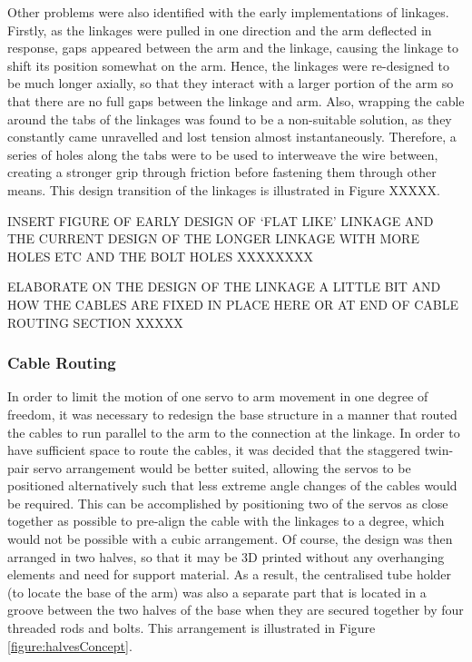 \documentclass[11pt]{article}
\begin{document}
Other problems were also identified with the early implementations of linkages. Firstly, as the linkages were pulled in one direction and the arm deflected in response, gaps appeared between the arm and the linkage, causing the linkage to shift its position somewhat on the arm. Hence, the linkages were re-designed to be much longer axially, so that they interact with a larger portion of the arm so that there are no full gaps between the linkage and arm. Also, wrapping the cable around the tabs of the linkages was found to be a non-suitable solution, as they constantly came unravelled and lost tension almost instantaneously. Therefore, a series of holes along the tabs were to be used to interweave the wire between, creating a stronger grip through friction before fastening them through other means. This design transition of the linkages is illustrated in Figure XXXXX.

INSERT FIGURE OF EARLY DESIGN OF `FLAT LIKE' LINKAGE AND THE CURRENT DESIGN OF THE LONGER LINKAGE WITH MORE HOLES ETC AND THE BOLT HOLES XXXXXXXX

ELABORATE ON THE DESIGN OF THE LINKAGE A LITTLE BIT AND HOW THE CABLES ARE FIXED IN PLACE HERE OR AT END OF CABLE ROUTING SECTION XXXXX

\subsubsection{Cable Routing}
In order to limit the motion of one servo to arm movement in one degree of freedom, it was necessary to redesign the base structure in a manner that routed the cables to run parallel to the arm to the connection at the linkage. In order to have sufficient space to route the cables, it was decided that the staggered twin-pair servo arrangement would be better suited, allowing the servos to be positioned alternatively such that less extreme angle changes of the cables would be required. This can be accomplished by positioning two of the servos as close together as possible to pre-align the cable with the linkages to a degree, which would not be possible with a cubic arrangement. Of course, the design was then arranged in two halves, so that it may be 3D printed without any overhanging elements and need for support material. As a result, the centralised tube holder (to locate the base of the arm) was also a separate part that is located in a groove between the two halves of the base when they are secured together by four threaded rods and bolts. This arrangement is illustrated in Figure \ref{figure:halvesConcept}.
\end{document}
